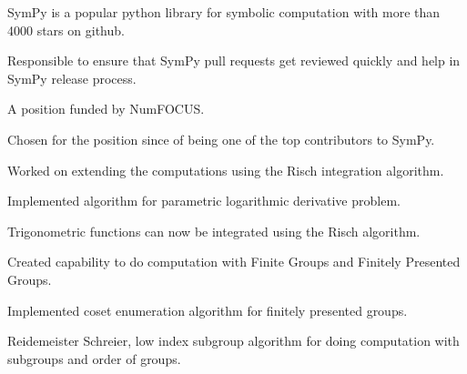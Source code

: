 \documentclass[]{deedy-resume-openfont}
\begin{document}
\begin{minipage}[t]{0.66\textwidth}
\vspace{\topsep} %
\vspace{\topsep}
\begin{tightemize}
\item SymPy is a popular python library for symbolic computation with more than 4000 stars on github.
\item Responsible to ensure that SymPy pull requests get reviewed quickly and help in SymPy release process.
\item A position funded by NumFOCUS.
\item Chosen for the position since of being one of the top contributors to SymPy.
\end{tightemize}
\sectionsep

\vspace{\topsep} %
\begin{tightemize}
\item Worked on extending the computations using the Risch integration algorithm.
\item Implemented algorithm for parametric logarithmic derivative problem.
\item Trigonometric functions can now be integrated using the Risch algorithm.
\end{tightemize}
\sectionsep

\vspace{\topsep} %
\begin{tightemize}
\item Created capability to do computation with Finite Groups and Finitely Presented Groups.
\item Implemented coset enumeration algorithm for finitely presented groups.
\item Reidemeister Schreier, low index subgroup algorithm for doing computation with subgroups and order of groups.
\end{tightemize}
\sectionsep



\end{minipage}
\end{document}

